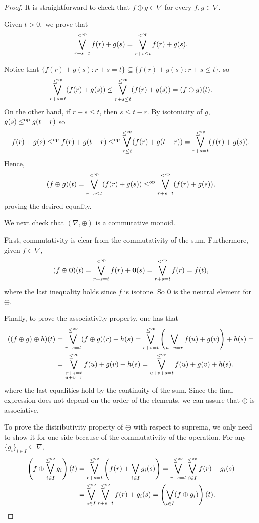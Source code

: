 \documentclass[10pt,a4paper]{amsart}
\begin{document}
	\begin{proof}
		
		It is straightforward to check that $f\oplus g\in\nabla$ for every $f,g\in\nabla.$
		
		
		Given $t>0,$ we prove that
		$$\bigvee_{r+s=t}^{\leq^\text{\normalfont op}}f(r)+g(s)=\bigvee_{r+s\leq t}^{\leq^\text{\normalfont op}}f(r)+g(s).$$
		
		
		Notice that $\{f(r)+ g(s): r+s=t\}\subseteq \{f(r)+g(s): r+s\leq t\}$, so
		\[\bigvee_{r+s=t}^{\leq^\text{\normalfont op}}(f(r)+g(s))\leq\bigvee_{r+s\leq t}^{\leq^\text{\normalfont op}}(f(r)+ g(s))=(f\oplus g)(t).\]
		On the other hand, if $r+s\leq t$, then $s\leq t-r$. By isotonicity of $g$, $g(s)\leq^\text{\normalfont op} g(t-r)$ so $$f(r)+g(s)\leq^\text{\normalfont op} f(r)+g(t-r)\leq^\text{\normalfont op}\bigvee_{r\leq t}^{\leq^\text{\normalfont op}}(f(r)+ g(t-r))=\bigvee_{r+s=t}^{\leq^\text{\normalfont op}}(f(r)+g(s)).$$ Hence,
		\[(f\oplus g)(t)=\bigvee_{r+s\leq t}^{\leq^\text{\normalfont op}}(f(r)+g(s))\leq^\text{\normalfont op} \bigvee_{r+s=t}^{\leq^\text{\normalfont op}}(f(r)+g(s)),\]
		proving the desired equality.
		
		We next check that $(\nabla,\oplus)$ is a commutative monoid.
		
		First, commutativity is clear from the commutativity of the sum. Furthermore, given $f\in\nabla$,
		\[(f\oplus\mathbf{0})(t)=\bigvee_{r+s=t}^{\leq^\text{\normalfont op}}f(r)+\mathbf{0}(s)=\bigvee_{r+s=t}^{\leq^\text{\normalfont op}}f(r)=f(t),\]
		where the last inequality holds since $f$ is isotone. So $\mathbf{0}$ is the neutral element for $\oplus.$
		
		
		Finally, to prove the associativity property, one has that
		\begin{align*}
			((f\oplus g)\oplus h)(t)&=\bigvee_{r+s=t}^{\leq^\text{\normalfont op}}(f\oplus g)(r)+h(s)=\bigvee_{r+s=t}^{\leq^\text{\normalfont op}}\left(\bigvee_{u+v=r}f(u)+g(v)\right)+h(s)=\\			&=\bigvee_{\substack{r+s=t \\ u+v=r}}^{\leq^\text{\normalfont op}}f(u)+g(v)+ h(s)=\bigvee_{u+v+s=t}^{\leq^\text{\normalfont op}}f(u)+ g(v)+ h(s).
		\end{align*}
		where the last equalities hold by the continuity of the sum. Since the final expression does not depend on the order of the elements, we can assure that $\oplus$ is associative.
		
		
		
		To prove the distributivity property of $\oplus$ with respect to suprema, we only need to show it for one side because of the commutativity of the operation. For any $\{g_i\}_{i\in I}\subseteq\nabla$,
		\begin{align*}
			\left(f\oplus \bigvee_{i\in I}^{\leq^\text{\normalfont op}}g_i\right)(t)&=\bigvee_{r+s=t}^{\leq^\text{\normalfont op}}\left(f(r)+\bigvee_{i\in I}g_i(s)\right)=\bigvee_{r+s=t}^{\leq^\text{\normalfont op}}\bigvee_{i\in I}^{\leq^\text{\normalfont op}}f(r)+ g_i(s)\\&=\bigvee_{i\in I}^{\leq^\text{\normalfont op}}\bigvee_{r+s=t}^{\leq^\text{\normalfont op}}f(r)+ g_i(s)=\left(\bigvee_{i\in I}(f\oplus g_i)\right)(t).
		\end{align*}
		

\end{proof}
\end{document}
